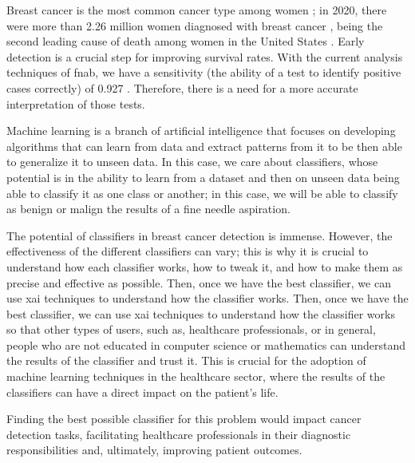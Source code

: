 
Breast cancer is the most common cancer type among women \cite{wcrf_international_breast_nodate}; in 2020, there were more than 2.26 million women diagnosed with breast cancer \cite{wcrf_international_breast_nodate}, being the second leading cause of death among women in the United States \cite{american_cancer_society_breast_nodate}. Early detection is a crucial step for improving survival rates. With the current analysis techniques of \ac{fnab},
we have a sensitivity (the ability of a test to identify positive cases correctly) of 0.927 \cite{yu_diagnostic_2012}. Therefore, there is a need for a more accurate interpretation of those tests.

Machine learning is a branch of artificial intelligence that focuses on developing algorithms that can learn from data and extract patterns from it to be then able to generalize it to unseen data. In this case, we care about classifiers, whose potential is in the ability to learn from a dataset and then on unseen data being able to classify it as one class or another; in this case, we will be able to classify as benign or malign the results of a fine needle aspiration.

The potential of classifiers in breast cancer detection is immense. However, the effectiveness of the different classifiers can vary; this is why it is crucial to understand how each classifier works, how to tweak it, and how to make them as precise and effective as possible. Then, once we have the best classifier, we can use \ac{xai} techniques to understand how the classifier works. Then, once we have the best classifier, we can use \ac{xai} techniques to understand how the classifier works so that other types of users, such as, healthcare professionals, or in general, people who are not educated in computer science or mathematics can understand the results of the classifier and trust it. This is crucial for the adoption of machine learning techniques in the healthcare sector, where the results of the classifiers can have a direct impact on the patient's life.

Finding the best possible classifier for this problem would impact cancer detection tasks, facilitating healthcare professionals in their diagnostic responsibilities and, ultimately, improving patient outcomes.
